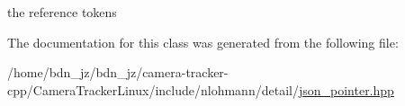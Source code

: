 the reference tokens 



The documentation for this class was generated from the following file\+:\begin{DoxyCompactItemize}
\item 
/home/bdn\+\_\+jz/bdn\+\_\+jz/camera-\/tracker-\/cpp/\+Camera\+Tracker\+Linux/include/nlohmann/detail/\hyperlink{json__pointer_8hpp}{json\+\_\+pointer.\+hpp}\end{DoxyCompactItemize}
